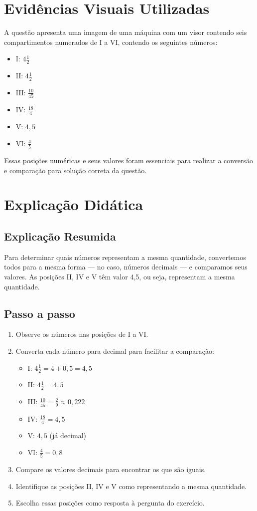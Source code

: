 \documentclass{article}
\begin{document}
\section{Evidências Visuais Utilizadas}
A questão apresenta uma imagem de uma máquina com um visor contendo seis compartimentos numerados de I a VI, contendo os seguintes números:
\begin{itemize}
  \item I: $4 \frac{1}{2}$
  \item II: $4 \frac{1}{2}$
  \item III: $\frac{10}{45}$
  \item IV: $\frac{18}{4}$
  \item V: $4,5$
  \item VI: $\frac{4}{5}$
\end{itemize}
Essas posições numéricas e seus valores foram essenciais para realizar a conversão e comparação para solução correta da questão.

\section{Explicação Didática}

\subsection{Explicação Resumida}
Para determinar quais números representam a mesma quantidade, convertemos todos para a mesma forma — no caso, números decimais — e comparamos seus valores. As posições II, IV e V têm valor 4,5, ou seja, representam a mesma quantidade.

\subsection{Passo a passo}
\begin{enumerate}
  \item Observe os números nas posições de I a VI.
  \item Converta cada número para decimal para facilitar a comparação:
  \begin{itemize}
    \item I: $4 \frac{1}{2} = 4 + 0,5 = 4,5$
    \item II: $4 \frac{1}{2} = 4,5$
    \item III: $\frac{10}{45} = \frac{2}{9} \approx 0,222$
    \item IV: $\frac{18}{4} = 4,5$
    \item V: $4,5$ (já decimal)
    \item VI: $\frac{4}{5} = 0,8$
  \end{itemize}
  \item Compare os valores decimais para encontrar os que são iguais.
  \item Identifique as posições II, IV e V como representando a mesma quantidade.
  \item Escolha essas posições como resposta à pergunta do exercício.
\end{enumerate}
\end{document}
